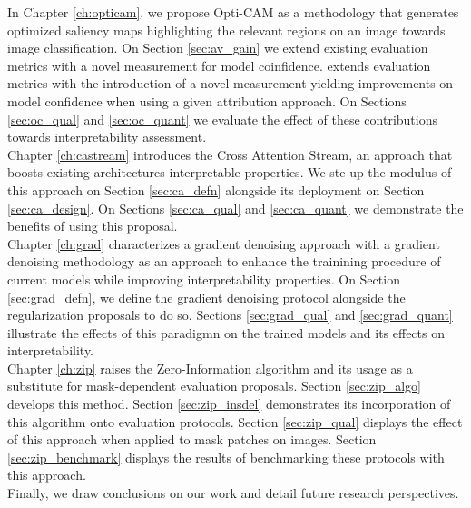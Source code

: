 \noindent In Chapter \ref{ch:opticam}, we propose Opti-CAM as a methodology that generates 
optimized saliency maps highlighting the relevant regions on an image towards image classification. 
On Section \ref{sec:av_gain} we extend existing evaluation metrics with a novel measurement for 
model coinfidence. extends evaluation metrics with the introduction of a novel measurement yielding
 improvements on model confidence when using a given attribution approach. 
On Sections \ref{sec:oc_qual} and \ref{sec:oc_quant} we evaluate the effect of these contributions 
towards interpretability assessment.\\

\noindent Chapter \ref{ch:castream} introduces the Cross Attention Stream, an approach that boosts existing 
architectures interpretable properties. We ste up the modulus of this approach on 
Section \ref{sec:ca_defn} alongside its deployment on Section \ref{sec:ca_design}. 
On Sections \ref{sec:ca_qual} and \ref{sec:ca_quant} we demonstrate the benefits of using this
proposal.\\

\noindent Chapter \ref{ch:grad} characterizes a gradient denoising approach with a gradient denoising 
methodology as an approach to enhance the trainining procedure of current models while improving 
interpretability properties. On Section \ref{sec:grad_defn}, we define the gradient denoising 
protocol alongside the regularization proposals to do so.
Sections \ref{sec:grad_qual} and \ref{sec:grad_quant} illustrate the effects of this paradigmn
on the trained models and its effects on interpretability.\\

\noindent Chapter \ref{ch:zip} raises the Zero-Information algorithm and its usage as a substitute
for mask-dependent evaluation proposals. Section \ref{sec:zip_algo} develops this 
method. Section \ref{sec:zip_insdel} demonstrates its incorporation of this 
algorithm onto evaluation protocols. Section \ref{sec:zip_qual} displays
the effect of this approach when applied to mask patches on images. Section 
\ref{sec:zip_benchmark} displays the results of benchmarking these protocols 
with this approach. \\
    
\noindent Finally, we draw conclusions on our work and detail future research perspectives.